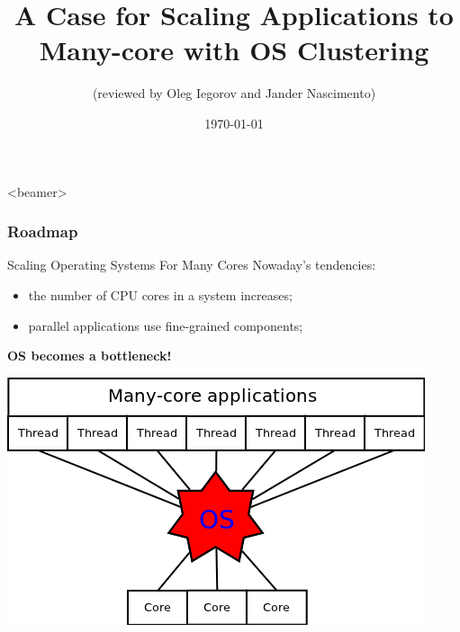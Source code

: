 \documentclass{beamer}
\title[A Case for Scaling Applications to Many-core with OS Clustering ]{A Case for Scaling Applications to Many-core with OS Clustering}
\author{
(reviewed by Oleg Iegorov and Jander Nascimento)}
\institute{University Joseph Fourier}
\date{\today}
\begin{document}
\begin{frame}
\titlepage
\end{frame}

{
  \begin{frame}<beamer>
    \frametitle{Roadmap}
    \tableofcontents%
  \end{frame}
}


\begin{frame}{Scaling Operating Systems For Many Cores}
  Nowaday's tendencies:
  \begin{itemize}
    \item the number of CPU cores in a system increases;
    \item parallel applications use fine-grained components;
  \newline
  \end{itemize}

  \pause
  \textbf{OS becomes a bottleneck!}
  \newline
  
  \begin{center}
    \includegraphics[scale=0.4]{bottleneck.png}
  \end{center}
\end{frame}
\end{document}
